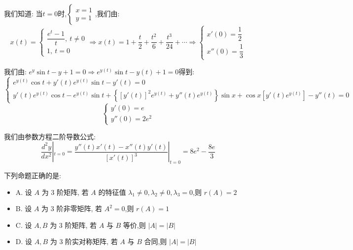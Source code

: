 \begin{solution}

	我们知道:  当$t=0$时,$\left\lbrace
	\begin{array}{l}
		x=1\\y=1
	\end{array}
	\right. $,我们由:  
	$$x(t)=\left\lbrace
	\begin{array}{l}
		\dfrac{e^t-1}{t},\ t\neq 0\\
		1,\ t=0
	\end{array}
	\right. \Rightarrow x(t)=1+\dfrac{t}{2}+\dfrac{t^2}{6}+\dfrac{t^3}{24}+\cdots\Rightarrow \left\lbrace
	\begin{array}{l}
		x'(0)=\dfrac{1}{2}\\
		x''(0)=\dfrac{1}{3}
	\end{array}
	\right. $$
	
	我们由:  $e^y\sin t-y+1=0\Rightarrow e^{y(t)}\sin t-y(t)+1=0$得到:  
	$$\left\lbrace
	\begin{array}{l}
		e^{y(t)}\cos t+y'(t)e^{y(t)}\sin t-y'(t)=0\\
		y'(t)e^{y(t)}\cos t-e^{y(t)}\sin t+\left\lbrace [y'(t)]^2e^{y(t)}+y''(t)e^{y(t)}\right\rbrace \sin x+\cos x\left[y'(t)e^{y(t)} \right]-y''(t)=0
	\end{array}
	\right.$$
	$$\left\lbrace
	\begin{array}{l}
		y'(0)=e\\
		y''(0)=2e^2
	\end{array}
	\right. $$
	
	我们由参数方程二阶导数公式:  
	$$\dfrac{d^2y}{dx^2}|_{t=0}=\dfrac{y''(t)x'(t)-x''(t)y'(t)}{[x'(t)]^3}|_{t=0}=8e^2-\dfrac{8e}{3}$$
	
\end{solution}

\begin{example}[][Exam: 34.2.10]
	下列命题正确的是:  
\begin{itemize}
	\item A. 设 $A$ 为 $3$ 阶矩阵, 若 $A$ 的特征值 $\lambda_{1}\neq 0,\lambda_{2}\neq 0,\lambda_{3}=0$,则 $r(A)=2$
	\item B. 设 $A$ 为 $3$ 阶非零矩阵, 若 $A^2=0$,则 $r(A)=1$
	\item C. 设 $A, B$ 为 $3$ 阶矩阵, 若 $A$ 与 $B$ 等价,则 $|A|=|B|$
	\item D. 设 $A, B$ 为 $3$ 阶实对称矩阵, 若 $A$ 与 $B$ 合同,则 $|A|=|B|$
\end{itemize}
\end{example}

